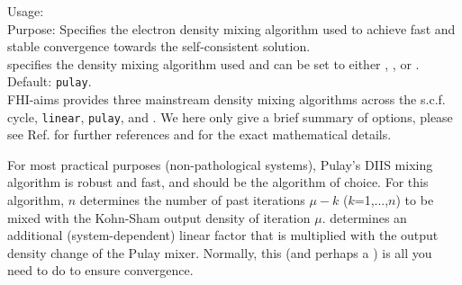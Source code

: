{
  \noindent
  Usage:   \\[1.0ex]
  Purpose: Specifies the electron density mixing algorithm used to
    achieve fast and stable convergence towards the self-consistent
    solution. \\[1.0ex]
   specifies the density mixing algorithm used and can
  be set to either , , or . Default: \texttt{pulay}. \\
}
FHI-aims provides three mainstream density mixing algorithms across the
s.c.f. cycle,  \texttt{linear}, \texttt{pulay}, and . We
here only give a brief summary of options, please see
Ref. \cite{Blum08} for further references and for the exact
mathematical details.

For most practical purposes (non-pathological systems), Pulay's DIIS
mixing algorithm \cite{Pulay80} is robust and fast, and should be the
algorithm of choice. For this algorithm,  $n$
determines the number of past iterations $\mu-k$ ($k$=1,...,$n$) to be
mixed with the Kohn-Sham output density of iteration
$\mu$.  determines an additional
(system-dependent) linear factor that is multiplied with the output
density change of the Pulay mixer. Normally, this (and perhaps a
) is all you need to do to ensure convergence.

